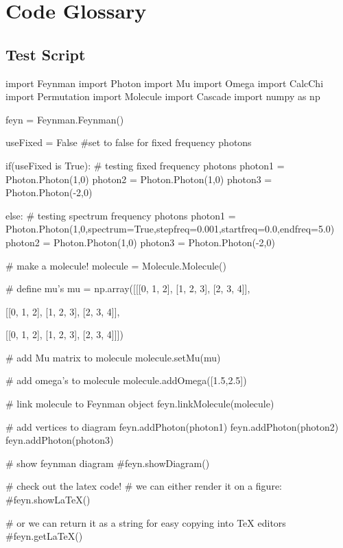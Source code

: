 \documentclass[11pt,a4paper,notitlepage]{article}
\begin{document}
\pagebreak

\section{Code Glossary}

\subsection{Test Script}

\begin{code}
import Feynman
import Photon
import Mu
import Omega
import CalcChi
import Permutation
import Molecule
import Cascade
import numpy as np

feyn = Feynman.Feynman()

useFixed = False #set to false for fixed frequency photons


if(useFixed is True):
    # testing fixed frequency photons
    photon1 = Photon.Photon(1,0)
    photon2 = Photon.Photon(1,0)
    photon3 = Photon.Photon(-2,0)

else:
    # testing spectrum frequency photons
    photon1 = Photon.Photon(1,0,spectrum=True,stepfreq=0.001,startfreq=0.0,endfreq=5.0)
    photon2 = Photon.Photon(1,0)
    photon3 = Photon.Photon(-2,0)


# make a molecule!
molecule = Molecule.Molecule()

# define mu's
mu = np.array([[[0, 1, 2],
                [1, 2, 3],
                [2, 3, 4]],
               
               [[0, 1, 2],
                [1, 2, 3],
                [2, 3, 4]],
               
               [[0, 1, 2],
                [1, 2, 3],
                [2, 3, 4]]])

# add Mu matrix to molecule
molecule.setMu(mu)

# add omega's to molecule
molecule.addOmega([1.5,2.5])

# link molecule to Feynman object
feyn.linkMolecule(molecule)

# add vertices to diagram
feyn.addPhoton(photon1)
feyn.addPhoton(photon2)
feyn.addPhoton(photon3)

# show feynman diagram
#feyn.showDiagram()

# check out the latex code!
# we can either render it on a figure:
#feyn.showLaTeX()

# or we can return it as a string for easy copying into TeX editors
#feyn.getLaTeX()


\end{code}
\end{document}

